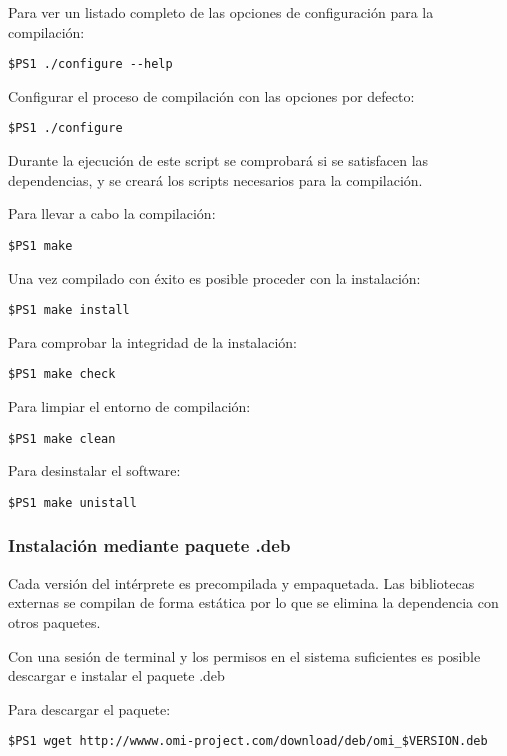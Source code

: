 Para ver un listado completo de las opciones de configuración para la compilación:
\begin{lstlisting}
$PS1 ./configure --help 
\end{lstlisting}

Configurar el proceso de compilación con las opciones por defecto:
\begin{lstlisting}
$PS1 ./configure 
\end{lstlisting}

Durante la ejecución de este script se comprobará si se satisfacen las dependencias, y se creará los scripts necesarios para la compilación.

Para llevar a cabo la compilación:
\begin{lstlisting}
$PS1 make 
\end{lstlisting}

Una vez compilado con éxito es posible proceder con la instalación:
\begin{lstlisting}
$PS1 make install
\end{lstlisting}

Para comprobar la integridad de la instalación:
\begin{lstlisting}
$PS1 make check
\end{lstlisting}
\pagebreak

Para limpiar el entorno de compilación:
\begin{lstlisting}
$PS1 make clean
\end{lstlisting}

Para desinstalar el software:
\begin{lstlisting}
$PS1 make unistall
\end{lstlisting}

\subsubsection{Instalación mediante paquete .deb}\label{sec:deb_pack}
Cada versión del intérprete es precompilada y empaquetada. Las bibliotecas externas se compilan
de forma estática por lo que se elimina la dependencia con otros paquetes.

Con una sesión de terminal y los permisos en el sistema suficientes es posible descargar e instalar el paquete .deb

Para descargar el paquete:
\begin{lstlisting}
$PS1 wget http://wwww.omi-project.com/download/deb/omi_$VERSION.deb
\end{lstlisting}

